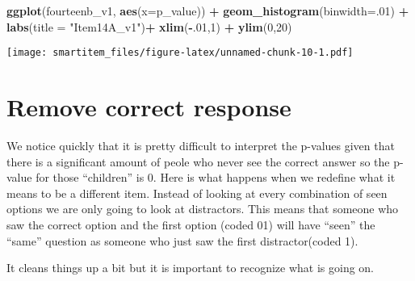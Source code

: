 \documentclass[]{book}
\newenvironment{Shaded}{\begin{snugshade}}{\end{snugshade}}
\newcommand{\KeywordTok}[1]{\textcolor[rgb]{0.13,0.29,0.53}{\textbf{#1}}}
\newcommand{\DataTypeTok}[1]{\textcolor[rgb]{0.13,0.29,0.53}{#1}}
\newcommand{\DecValTok}[1]{\textcolor[rgb]{0.00,0.00,0.81}{#1}}
\newcommand{\StringTok}[1]{\textcolor[rgb]{0.31,0.60,0.02}{#1}}
\newcommand{\OperatorTok}[1]{\textcolor[rgb]{0.81,0.36,0.00}{\textbf{#1}}}
\newcommand{\NormalTok}[1]{#1}
\theoremstyle{definition}
\theoremstyle{definition}
\theoremstyle{definition}
\theoremstyle{remark}
\begin{document}
\begin{Shaded}
\begin{Highlighting}[]
\KeywordTok{ggplot}\NormalTok{(fourteenb_v1, }\KeywordTok{aes}\NormalTok{(}\DataTypeTok{x=}\NormalTok{p_value)) }\OperatorTok{+}\StringTok{ }\KeywordTok{geom_histogram}\NormalTok{(}\DataTypeTok{binwidth=}\NormalTok{.}\DecValTok{01}\NormalTok{) }\OperatorTok{+}\StringTok{ }\KeywordTok{labs}\NormalTok{(}\DataTypeTok{title =} \StringTok{"Item14A_v1"}\NormalTok{)}\OperatorTok{+}\StringTok{ }\KeywordTok{xlim}\NormalTok{(}\OperatorTok{-}\NormalTok{.}\DecValTok{01}\NormalTok{,}\DecValTok{1}\NormalTok{) }\OperatorTok{+}\StringTok{ }\KeywordTok{ylim}\NormalTok{(}\DecValTok{0}\NormalTok{,}\DecValTok{20}\NormalTok{)}
\end{Highlighting}
\end{Shaded}

\texttt{[image: smartitem\_files/figure-latex/unnamed-chunk-10-1.pdf]}

\section{Remove correct response}\label{remove-correct-response}

We notice quickly that it is pretty difficult to interpret the p-values
given that there is a significant amount of peole who never see the
correct answer so the p-value for those ``children'' is 0. Here is what
happens when we redefine what it means to be a different item. Instead
of looking at every combination of seen options we are only going to
look at distractors. This means that someone who saw the correct option
and the first option (coded 01) will have ``seen'' the ``same'' question
as someone who just saw the first distractor(coded 1).

It cleans things up a bit but it is important to recognize what is going
on.
\end{document}
